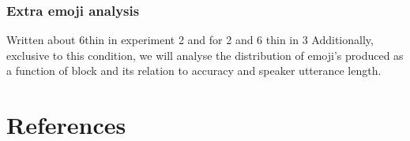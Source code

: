 \documentclass[
  english,
  a4paper,
]{article}
\begin{document}
\hypertarget{extra-emoji-analysis}{%
\subsubsection{Extra emoji analysis}\label{extra-emoji-analysis}}

Written about 6thin in experiment 2 and for 2 and 6 thin in 3
Additionally, exclusive to this condition, we will analyse the distribution of emoji's produced as a function of block and its relation to accuracy and speaker utterance length.

\hypertarget{references}{%
\section{References}\label{references}}

\setlength{\parindent}{-0.1in} 
\setlength{\leftskip}{0.125in}

\noindent
\end{document}
